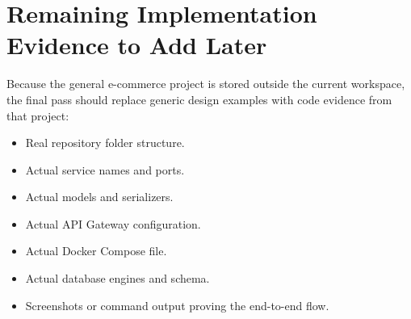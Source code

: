 \documentclass[12pt,a4paper]{article}
\begin{document}
\appendix

\section{Remaining Implementation Evidence to Add Later}

Because the general e-commerce project is stored outside the current workspace, the final pass should replace generic design examples with code evidence from that project:

\begin{itemize}
    \item Real repository folder structure.
    \item Actual service names and ports.
    \item Actual models and serializers.
    \item Actual API Gateway configuration.
    \item Actual Docker Compose file.
    \item Actual database engines and schema.
    \item Screenshots or command output proving the end-to-end flow.
\end{itemize}
\end{document}
